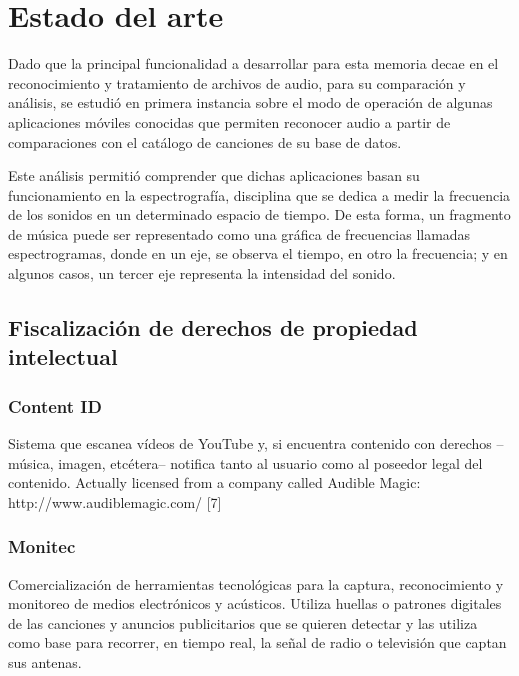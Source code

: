 
\chapter{Estado del arte}
Dado que la principal funcionalidad a desarrollar para esta memoria decae en el reconocimiento y tratamiento de archivos de audio, para su comparación y análisis, se estudió en primera instancia sobre el modo de operación de algunas aplicaciones móviles conocidas que permiten reconocer audio a partir de comparaciones con el catálogo de canciones de su base de datos. 

\bigskip

Este análisis permitió comprender que dichas aplicaciones basan su funcionamiento en la espectrografía, disciplina que se dedica a medir la frecuencia de los sonidos en un determinado espacio de tiempo. De esta forma, un fragmento de música puede ser representado como una gráfica de frecuencias llamadas espectrogramas, donde en un eje, se observa el tiempo, en otro la frecuencia; y en algunos casos, un tercer eje representa la intensidad del sonido.


\section{Fiscalización de derechos de propiedad intelectual} \label{sec:FiscalizacionDDAA}
\lipsum[2-4]

\subsection{Content ID}
Sistema que escanea vídeos de YouTube y, si encuentra contenido con derechos –música, imagen, etcétera– notifica tanto al usuario como al poseedor legal del contenido.
Actually licensed from a company called Audible Magic: http://www.audiblemagic.com/ [7]


\subsection{Monitec}
Comercialización de herramientas tecnológicas para la captura, reconocimiento y monitoreo de medios electrónicos y acústicos. Utiliza huellas o patrones digitales de las canciones y anuncios publicitarios que se quieren detectar y las utiliza como base para recorrer, en tiempo real, la señal de radio o televisión que captan sus antenas.

\bigskip


